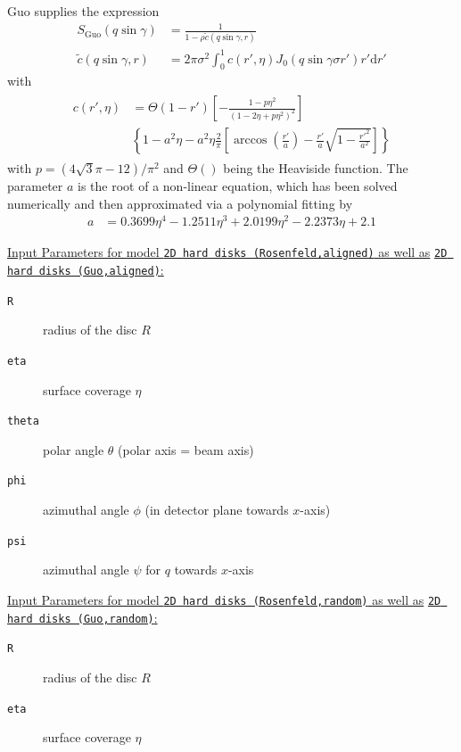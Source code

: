 Guo \cite{Guo2006} supplies the expression
\begin{align}
S_\mathrm{Guo}(q\sin\gamma) &= \frac{1}{1-\rho \tilde{c}(q\sin\gamma,r)} \\
\tilde{c}(q\sin\gamma,r) &= 2\pi\sigma^2 \int_0^1 c(r',\eta) J_0(q\sin\gamma\sigma r') r' \mathrm{d}r'
\end{align}
with
\begin{align}
\begin{split}
c(r',\eta) &=
\Theta(1-r') \left[-\frac{1-p\eta^2}{\left(1-2\eta+p\eta^2\right)^2}\right]  \\
&\left\{1-a^2\eta-a^2\eta\frac{2}{\pi}\left[\arccos\left(\frac{r'}{a}\right)-\frac{r'}{a}\sqrt{1-\frac{r'^2}{a^2}}\right]\right\}
\end{split}
\end{align}
with $p=\left(4\sqrt{3}\pi-12\right)/\pi^2$ and $\Theta()$ being the Heaviside function. The parameter $a$ is the root of a non-linear equation, which has been solved numerically and then approximated via a polynomial fitting by
\begin{align}
a &= 0.3699\eta^4
      -1.2511\eta^3
      +2.0199\eta^2
      -2.2373\eta
      +2.1
\end{align}

\vspace{5mm}
\noindent
\uline{Input Parameters for model \texttt{2D hard disks (Rosenfeld,aligned)} as well as}
\uline{\texttt{2D hard disks (Guo,aligned)}:}\\
\begin{description}
\item[\texttt{R}] radius of the disc $R$
\item[\texttt{eta}] surface coverage $\eta$
\item[\texttt{theta}] polar angle $\theta$ (polar axis = beam axis)
\item[\texttt{phi}] azimuthal angle $\phi$ (in detector plane towards $x$-axis)
\item[\texttt{psi}] azimuthal angle  $\psi$ for $q$ towards $x$-axis
\end{description}

\vspace{5mm}
\noindent
\uline{Input Parameters for model \texttt{2D hard disks (Rosenfeld,random)} as well as}
\uline{\texttt{2D hard disks (Guo,random)}:}\\
\begin{description}
\item[\texttt{R}] radius of the disc $R$
\item[\texttt{eta}] surface coverage $\eta$
\end{description}

